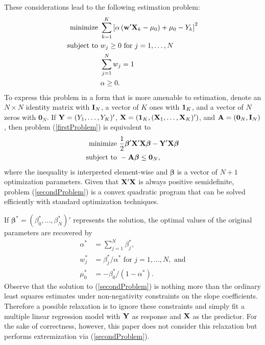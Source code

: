 \documentclass[11pt]{article}
\theoremstyle{definition}
\theoremstyle{definition}
\def\one{{\bf 1}}
\def\w{{\bf w}}
\def\A{{\bf A}}
\def\X{{\bf X}}
\def\Y{{\bf Y}}
\def\Beta{\boldsymbol{\beta}}
\def\I{{\bf I}}
\begin{document}
These considerations lead to the following estimation problem:
\begin{align}
 \label{firstProblem}
 \begin{split}
\text{minimize } & \sum_{k=1}^K \left[ \alpha  \left(  \w'\X_{k} - \mu_0\right) + \mu_0 - Y_k \right]^2\\
\text{subject to } & w_j \geq 0 \text{ for } j = 1, \dots, N\\
& \sum_{j=1}^N w_j = 1\\
& \alpha \geq 0.
\end{split}
\end{align}
To express this problem in a form that is more amenable to estimation, denote an $N \times N$ identity matrix with $\I_N$,  a vector of $K$ ones with $\one_K$, and a vector of $N$ zeros with $\boldsymbol{0}_N$. If $\Y = (Y_1, \dots, Y_K)'$, $\X = (\one_K, (\X_1, \dots, \X_K)')$, and $\A = (\boldsymbol{0}_N, \I_N)$, then  problem (\ref{firstProblem}) is equivalent to
\begin{align}
 \label{secondProblem}
 \begin{split}
\text{minimize } & \frac{1}{2} \Beta' \X'\X \Beta - \Y'\X\Beta\\
\text{subject to } & -\A\Beta \leq \boldsymbol{0}_N,
\end{split}
\end{align}
where the inequality is interpreted element-wise and $\Beta$ is a vector of $N+1$ optimization parameters. Given that $\X'\X$ is always positive semidefinite, problem (\ref{secondProblem}) is a convex quadratic program that can be solved efficiently with standard optimization techniques. 
 
 If $\Beta^* = (\beta_0^*, \dots, \beta_{N}^*)'$ represents the solution, the optimal values of the original parameters are recovered by
\begin{align*}
\alpha^* &= \sum_{j=1}^N \beta_j^*,\\
w_j^* &=  \beta_j^*/\alpha^* \text{ for } j = 1, \dots, N, \text{ and}\\
\mu_0^* &= -\beta_0^*/(1-\alpha^*).
\end{align*}
Observe that the solution to (\ref{secondProblem}) is nothing more than the ordinary least squares estimates under non-negativity constraints on the slope coefficients. Therefore a possible relaxation is to ignore these constraints and simply fit a multiple linear regression model with $\Y$ as response and $\X$ as the predictor. For the sake of correctness, however, this paper does not consider this relaxation but performs extremization via (\ref{secondProblem}). 
\end{document}
